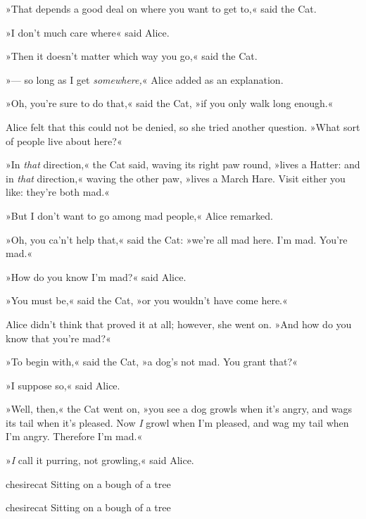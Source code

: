 »That depends a good deal on where you want to get to,« said the Cat.

»I don't much care where\longdash« said Alice.

»Then it doesn't matter which way you go,« said the Cat.

»— so long as I get \textit{somewhere,}« Alice added as an explanation.

»Oh, you're sure to do that,« said the Cat, »if you only walk long enough.«

Alice felt that this could not be denied, so she tried another question. »What sort of people live about here?«

»In \textit{that} direction,« the Cat said, waving its right paw round, »lives a Hatter: and in \textit{that} direction,« waving the other paw, »lives a March Hare. Visit either you like: they're both mad.«

»But I don't want to go among mad people,« Alice remarked.

»Oh, you ca'n't help that,« said the Cat: »we're all mad here. I'm mad. You're mad.«

»How do you know I'm mad?« said Alice.

»You must be,« said the Cat, »or you wouldn't have come here.«

Alice didn't think that proved it at all; however, she went on. »And how do you know that you're mad?«

»To begin with,« said the Cat, »a dog's not mad. You grant that?«

»I suppose so,« said Alice.

»Well, then,« the Cat went on, »you see a dog growls when it's angry, and wags its tail when it's pleased. Now \textit{I} growl when I'm pleased, and wag my tail when I'm angry. Therefore I'm mad.«

»\textit{I} call it purring, not growling,« said Alice.


\begin{pictures}
	\begin{letter}
		\begin{bwbigpic}
			[1.2]
			{chesirecat}
			{Sitting on a bough of a tree}
		\end{bwbigpic}
	\end{letter}
	\begin{a4}
		\begin{bwbigpic}
			[1.1]
			{chesirecat}
			{Sitting on a bough of a tree}
		\end{bwbigpic}
	\end{a4}
\end{pictures}


